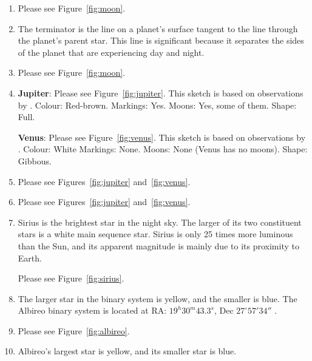 \documentclass[11pt]{article}
\begin{document}
\begin{enumerate}[label={\textbf{\emph{(\arabic*)}}}]
	\item %
Please see Figure~\ref{fig:moon}.

	\item %
The terminator is the line on a planet's surface tangent to the line through the planet's parent star.
This line is significant because it separates the sides of the planet that are experiencing day and night.

	\item %
Please see Figure~\ref{fig:moon}.

	\item %
\textbf{Jupiter}: Please see Figure~\ref{fig:jupiter}.
This sketch is based on observations by \cite{deepskywatch}.
\newline
Colour: Red-brown.
\newline
Markings: Yes.
\newline
Moons: Yes, some of them.
\newline
Shape: Full.

\textbf{Venus}: Please see Figure~\ref{fig:venus}.
This sketch is based on observations by \cite{nakedeyeplanets}.
\newline
Colour: White
\newline
Markings: None.
\newline
Moons: None (Venus has no moons).
\newline
Shape: Gibbous.

	\item %
Please see Figures~\ref{fig:jupiter} and~\ref{fig:venus}.

	\item %
Please see Figures~\ref{fig:jupiter} and~\ref{fig:venus}.

	\item %
Sirius is the brightest star in the night sky.
The larger of its two constituent stars is a white main sequence star.
Sirius is only 25 times more luminous than the Sun, and its apparent magnitude is mainly due to its proximity to Earth.

Please see Figure~\ref{fig:sirius}.

	\item %
The larger star in the binary system is yellow, and the smaller is blue.
The Albireo binary system is located at RA: $19^h 30^m 43.3^s$, Dec $27^\circ 57' 34''$ \cite{albireo}.

	\item %
Please see Figure~\ref{fig:albireo}.

	\item %
Albireo's largest star is yellow, and its smaller star is blue.


\end{enumerate}
\end{document}
